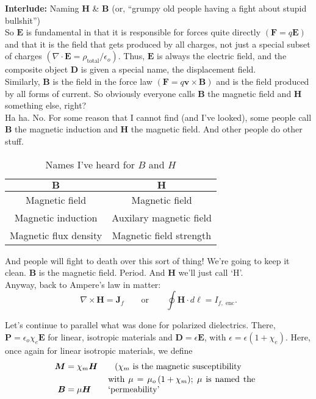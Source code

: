\documentclass{article}
\numberwithin{equation}{section}
\begin{document}
\textbf{Interlude: }Naming $\bm{H}$ \& $\bm{B}$ (or, ``grumpy old people having a fight about stupid bullshit'') \\

So $\bm{E}$ is fundamental in that it is responsible for forces quite directly $\left( \bm{F} = q\bm{E} \right)$ and that  it is the field that gets produced by all charges, not just a special subset of charges $\left( \nabla \cdot \bm{E} = \rho_{\text{total}}/\epsilon_o \right)$. Thus, $\bm{E}$ is always the electric field, and the composite object $\bm{D}$ is given a special name, the displacement field. \\

Similarly, $\bm{B}$ is the field in the force law $\left( \bm{F} = q\bm{v} \times \bm{B} \right)$ and is the field produced by all forms of current. So obviously everyone calls $\bm{B}$ the magnetic field and $\bm{H}$ something else, right? \\

Ha ha. No. For some reason that I cannot find (and I've looked), some people call $\bm{B}$ the magnetic induction and $\bm{H}$ the magnetic field. And other people do other stuff.

\begin{table}[H]
\centering
{}
\caption*{Names I've heard for $B$ and $H$}
\begin{tabular}{@{}c|c@{}}
\toprule
$\bm{B}$ & $\bm{H}$ \\ \midrule
Magnetic field & Magnetic field \\
Magnetic induction & Auxilary magnetic field \\
Magnetic flux density & Magnetic field strength \\ \bottomrule
\end{tabular}
\label{tab:23:names}
\end{table}

And people will fight to death over this sort of thing! We're going to keep it clean. $\bm{B}$ is the magnetic field. Period. And $\bm{H}$ we'll just call `H'. \\

Anyway, back to Ampere's law in matter:
\begin{equation*}
    \nabla \times \bm{H} = \bm{J}_f \qquad \text{or} \qquad \oint \bm{H} \cdot d\bm{\ell} = I_{f,\text{ enc}}.
\end{equation*}

Let's continue to parallel what was done for polarized dielectrics. There, $\bm{P} = \epsilon_o \chi_e \bm{E}$ for linear, isotropic materials and $\bm{D} = \epsilon \bm{E}$, with $\epsilon = \epsilon \left( 1 + \chi_e \right)$. Here, once again for linear isotropic materials, we define
\begin{align*}
    \bm{M} &= \chi_m \bm{H} \qquad \parbox[b]{0.5\linewidth}{($\chi_m$ is the magnetic susceptibility} \\
    \bm{B} &= \mu \bm{H} \qquad \parbox[b]{0.5\linewidth}{with $\mu = \mu_o\left( 1 + \chi_m \right)$; $\mu$ is named the `permeability'}
\end{align*}
\end{document}
